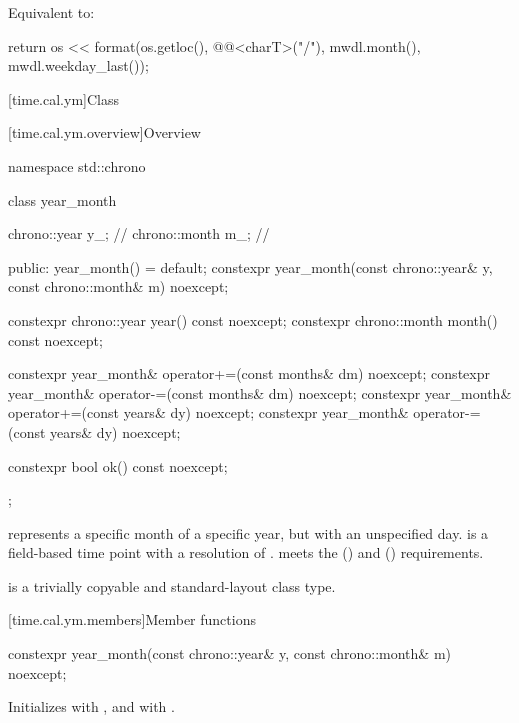 \begin{itemdescr}
\pnum
\effects
Equivalent to:
\begin{codeblock}
return os << format(os.getloc(), @@<charT>("{}/{}"),
                    mwdl.month(), mwdl.weekday_last());
\end{codeblock}
\end{itemdescr}

[time.cal.ym]{Class }

[time.cal.ym.overview]{Overview}

\begin{codeblock}
namespace std::chrono {
  class year_month {
    chrono::year  y_;           // \expos
    chrono::month m_;           // \expos

  public:
    year_month() = default;
    constexpr year_month(const chrono::year& y, const chrono::month& m) noexcept;

    constexpr chrono::year  year()  const noexcept;
    constexpr chrono::month month() const noexcept;

    constexpr year_month& operator+=(const months& dm) noexcept;
    constexpr year_month& operator-=(const months& dm) noexcept;
    constexpr year_month& operator+=(const years& dy)  noexcept;
    constexpr year_month& operator-=(const years& dy)  noexcept;

    constexpr bool ok() const noexcept;
  };
}
\end{codeblock}

\pnum
{} represents a specific month of a specific year,
but with an unspecified day.
 is a field-based time point with a resolution of .
 meets the  ()
and  () requirements.

\pnum
{} is a trivially copyable and standard-layout class type.

[time.cal.ym.members]{Member functions}

%
\begin{itemdecl}
constexpr year_month(const chrono::year& y, const chrono::month& m) noexcept;
\end{itemdecl}

\begin{itemdescr}
\pnum
\effects
Initializes  with , and  with .
\end{itemdescr}

